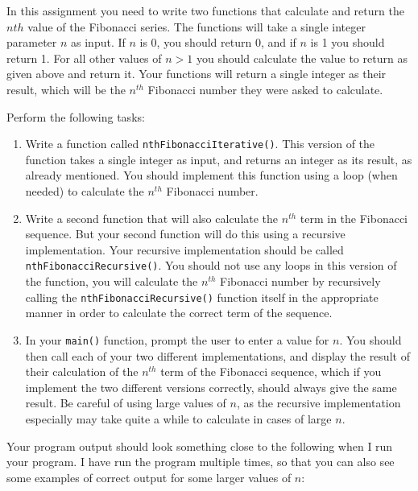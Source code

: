 \documentclass[11pt]{article}
\begin{document}
In this assignment you need to write two functions that calculate
and return the $nth$ value of the Fibonacci series.  The functions
will take a single integer parameter $n$ as input.  If $n$ is 0, you
should return 0, and if $n$ is 1 you should return 1.  For all other
values of $n>1$ you should calculate the value to return as given
above and return it.  Your functions will return a single integer
as their result, which will be the $n^{th}$ Fibonacci number they
were asked to calculate.

Perform the following tasks:

\begin{enumerate}
\item Write a function called \verb~nthFibonacciIterative()~.  This version of
   the function takes a single integer as input, and returns an
   integer as its result, as already mentioned.  You should implement
   this function using a loop (when needed) to calculate the $n^{th}$
   Fibonacci number.
\item Write a second function that will also calculate the $n^{th}$ term
   in the Fibonacci sequence.  But your second function will do this
   using a recursive implementation.  Your recursive implementation
   should be called \verb~nthFibonacciRecursive()~.  You should not use any
   loops in this version of the function, you will calculate the
   $n^{th}$ Fibonacci number by recursively calling the
   \verb~nthFibonacciRecursive()~ function itself in the appropriate manner
   in order to calculate the correct term of the sequence.
\item In your \verb~main()~ function, prompt the user to enter a value for $n$.
   You should then call each of your two different implementations, and
   display the result of their calculation of the $n^{th}$ term of the
   Fibonacci sequence, which if you implement the two different versions
   correctly, should always give the same result.  Be careful of using
   large values of $n$, as the recursive implementation especially may
   take quite a while to calculate in cases of large $n$.
\end{enumerate}

Your program output should look something close to the following when I
run your program.  I have run the program multiple times, so that you
can also see some examples of correct output for some larger values
of $n$:
\end{document}
